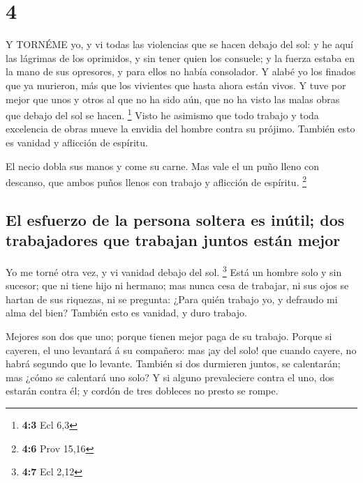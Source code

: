 \hypertarget{section-3}{%
\section{4}\label{section-3}}

 Y TORNÉME yo, y vi todas las violencias que se hacen debajo
del sol: y he aquí las lágrimas de los oprimidos, y sin tener quien los
consuele; y la fuerza estaba en la mano de sus opresores, y para ellos
no había consolador.  Y alabé yo los finados que ya
murieron, más que los vivientes que hasta ahora están vivos.
 Y tuve por mejor que unos y otros al que no ha sido aún,
que no ha visto las malas obras que debajo del sol se hacen. \footnote{\textbf{4:3}
  Ecl 6,3}  Visto he asimismo que todo trabajo y toda
excelencia de obras mueve la envidia del hombre contra su prójimo.
También esto es vanidad y aflicción de espíritu.

 El necio dobla sus manos y come su carne.  Mas
vale el un puño lleno con descanso, que ambos puños llenos con trabajo y
aflicción de espíritu. \footnote{\textbf{4:6} Prov 15,16}

\hypertarget{el-esfuerzo-de-la-persona-soltera-es-inuxfatil-dos-trabajadores-que-trabajan-juntos-estuxe1n-mejor}{%
\subsection{El esfuerzo de la persona soltera es inútil; dos
trabajadores que trabajan juntos están
mejor}\label{el-esfuerzo-de-la-persona-soltera-es-inuxfatil-dos-trabajadores-que-trabajan-juntos-estuxe1n-mejor}}

 Yo me torné otra vez, y vi vanidad debajo del sol.
\footnote{\textbf{4:7} Ecl 2,12}  Está un hombre solo y sin
sucesor; que ni tiene hijo ni hermano; mas nunca cesa de trabajar, ni
sus ojos se hartan de sus riquezas, ni se pregunta: ¿Para quién trabajo
yo, y defraudo mi alma del bien? También esto es vanidad, y duro
trabajo.

 Mejores son dos que uno; porque tienen mejor paga de su
trabajo.  Porque si cayeren, el uno levantará á su
compañero: mas ¡ay del solo! que cuando cayere, no habrá segundo que lo
levante.  También si dos durmieren juntos, se calentarán;
mas ¿cómo se calentará uno solo?  Y si alguno prevaleciere
contra el uno, dos estarán contra él; y cordón de tres dobleces no
presto se rompe.


